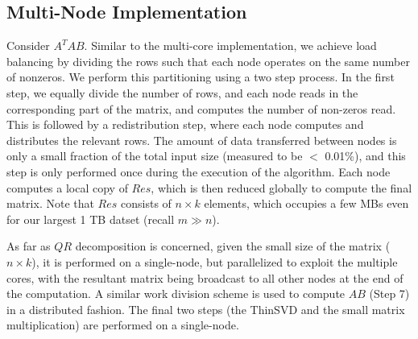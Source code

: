 \iffalse
\begin{itemize}
\item Cache-Friendly 
\item SIMD
\item Thread- or core-level
\item Multi-socket 
\end{itemize}
\fi

\subsection {Multi-Node Implementation}
Consider $A^TAB$.
Similar to the multi-core implementation, we achieve load balancing by
dividing the rows %
such that each node operates on the same number of nonzeros. 
We perform this partitioning using a two step
process. In the first step, we equally divide the number of rows, 
and each node reads in the corresponding
part of the matrix, and computes the number of non-zeros read. This is
followed by a redistribution step, where each node computes 
and distributes the relevant rows.
The amount of data transferred between nodes is only a small fraction of the total input size
(measured to be $<$ 0.01\%), and this step is only performed once during the execution of
the algorithm.
Each node computes a local copy of $Res$, which is then
reduced globally to compute the final matrix. Note that $Res$ consists
of $n \times k$ elements, which occupies a few MBs even
for our largest 1 TB datset  (recall $m \gg n$). 

As far as $QR$ decomposition is concerned, given the small size of the
matrix ($n \times k$), it is performed on a
single-node, but parallelized to exploit the multiple cores, with the resultant matrix being broadcast
to all other nodes at the end of the computation.
A similar work division scheme is used to compute $AB$ (Step 7) in a
distributed fashion. The final two steps (the ThinSVD and the small matrix
multiplication) are performed on a single-node.




